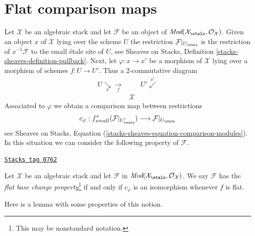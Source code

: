 \section{Flat comparison maps}
\label{stacks-cohomology-section-flat-comparison}
Let $\mathcal{X}$ be an algebraic stack and let $\mathcal{F}$ be an object
of $\textit{Mod}(\mathcal{X}_\etale, \mathcal{O}_\mathcal{X})$.
Given an object $x$ of $\mathcal{X}$ lying over the scheme $U$ the
restriction $\mathcal{F}|_{U_\etale}$ is the restriction of
$x^{-1}\mathcal{F}$ to the small \'etale site of $U$, see
Sheaves on Stacks, Definition \ref{stacks-sheaves-definition-pullback}.
Next, let $\varphi : x \to x'$ be a morphism of $\mathcal{X}$ lying
over a morphism of schemes $f : U \to U'$. Thus a $2$-commutative diagram
$$
\begin{array}{ccc}U \underset{x}{\searrow}\underset{f}{\longrightarrow} &  & U' \overset{x'}{\swarrow} \\  & \mathcal{X} & \end{array}
$$
Associated to $\varphi$ we obtain a comparison map between restrictions
\begin{equation}
\label{equation-comparison-modules}
c_\varphi :
f_{small}^*(\mathcal{F}|_{U'_\etale})
\longrightarrow
\mathcal{F}|_{U_\etale}
\end{equation}
see Sheaves on Stacks, Equation
(\ref{stacks-sheaves-equation-comparison-modules}).
In this situation we can consider the following property
of $\mathcal{F}$.

\begin{definition}
\label{stacks-cohomology-definition-flat-base-change}
\href{https://stacks.math.columbia.edu/tag/0762}{\texttt{Stacks tag 0762}}

Let $\mathcal{X}$ be an algebraic stack and let $\mathcal{F}$ in
$\textit{Mod}(\mathcal{X}_\etale, \mathcal{O}_\mathcal{X})$.
We say $\mathcal{F}$ has the {\it flat base change property}\footnote{This
may be nonstandard notation.}
if and only if $c_\varphi$ is an isomorphism whenever $f$ is flat.
\end{definition}

Here is a lemma with some properties of this notion.

